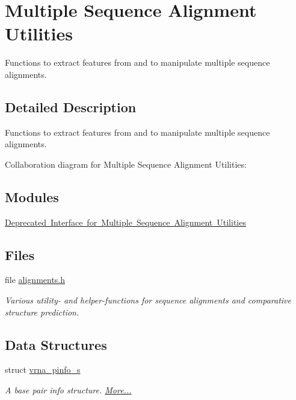 \hypertarget{group__aln__utils}{}\section{Multiple Sequence Alignment Utilities}
\label{group__aln__utils}


Functions to extract features from and to manipulate multiple sequence alignments.  




\subsection{Detailed Description}
Functions to extract features from and to manipulate multiple sequence alignments. 

Collaboration diagram for Multiple Sequence Alignment Utilities\+:
\subsection*{Modules}
\begin{DoxyCompactItemize}
\item 
\mbox{\hyperlink{group__aln__utils__deprecated}{Deprecated Interface for Multiple Sequence Alignment Utilities}}
\end{DoxyCompactItemize}
\subsection*{Files}
\begin{DoxyCompactItemize}
\item 
file \mbox{\hyperlink{utils_2alignments_8h}{alignments.\+h}}
\begin{DoxyCompactList}\small\item\em Various utility-\/ and helper-\/functions for sequence alignments and comparative structure prediction. \end{DoxyCompactList}\end{DoxyCompactItemize}
\subsection*{Data Structures}
\begin{DoxyCompactItemize}
\item 
struct \mbox{\hyperlink{group__aln__utils_structvrna__pinfo__s}{vrna\+\_\+pinfo\+\_\+s}}
\begin{DoxyCompactList}\small\item\em A base pair info structure.  \mbox{\hyperlink{group__aln__utils_structvrna__pinfo__s}{More...}}\end{DoxyCompactList}\end{DoxyCompactItemize}
